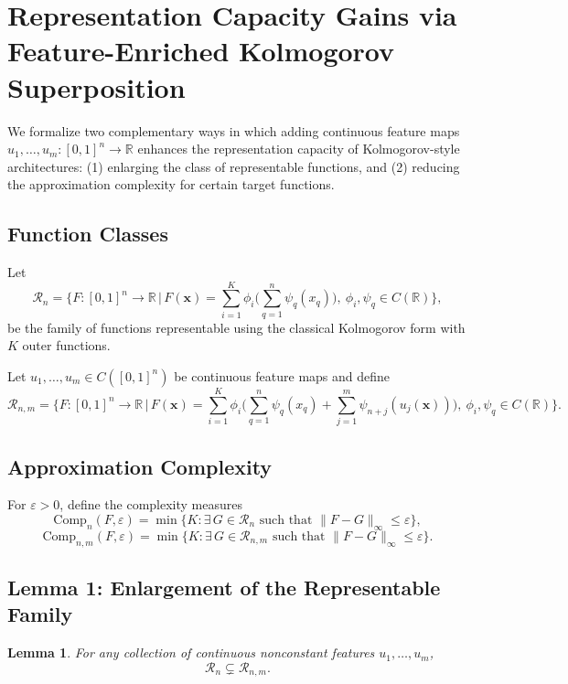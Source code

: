 \documentclass{article}
\newtheorem{lemma}{Lemma}
\begin{document}
\section{Representation Capacity Gains via Feature-Enriched Kolmogorov Superposition}
\label{th3:representation_capactiy_gains}
We formalize two complementary ways in which adding continuous feature maps 
\(u_1,\dots,u_m : [0,1]^n \to \mathbb{R}\) enhances the representation capacity 
of Kolmogorov-style architectures: 
(1) enlarging the class of representable functions, and 
(2) reducing the approximation complexity for certain target functions.

\subsection{Function Classes}

Let
\[
\mathcal{R}_{n}
= 
\Big\{
F:[0,1]^n \to \mathbb{R}
\,\big|\,
F(\mathbf{x})=\sum_{i=1}^{K}
\phi_i\!\Big(\sum_{q=1}^{n}\psi_q(x_q)\Big),
\ \phi_i,\psi_q\in C(\mathbb{R})
\Big\},
\]
be the family of functions representable using the classical
Kolmogorov form with \(K\) outer functions.

Let \(u_1,\dots,u_m \in C([0,1]^n)\) be continuous feature maps and define
\[
\mathcal{R}_{n,m}
=
\Big\{
F:[0,1]^n \to \mathbb{R}
\,\big|\,
F(\mathbf{x})=\sum_{i=1}^{K}
\phi_i\!\Big(
\sum_{q=1}^{n}\psi_q(x_q)
+
\sum_{j=1}^{m}\psi_{n+j}(u_j(\mathbf{x}))
\Big),
\ \phi_i,\psi_q \in C(\mathbb{R})
\Big\}.
\]


\subsection{Approximation Complexity}

For \(\varepsilon>0\), define the complexity measures
\[
\mathrm{Comp}_{n}(F,\varepsilon)
=
\min\Big\{
K :
\exists\, G\in\mathcal{R}_{n}
\text{ such that } 
\|F-G\|_{\infty}\le\varepsilon
\Big\},
\]
\[
\mathrm{Comp}_{n,m}(F,\varepsilon)
=
\min\Big\{
K :
\exists\, G\in\mathcal{R}_{n,m}
\text{ such that } 
\|F-G\|_{\infty}\le\varepsilon
\Big\}.
\]

\subsection{Lemma 1: Enlargement of the Representable Family}

\begin{lemma}
\label{lem:enlargement}
For any collection of continuous nonconstant features
\(u_1,\dots,u_m\),
\[
\mathcal{R}_{n} \subsetneq \mathcal{R}_{n,m}.
\]
\end{lemma}
\end{document}
